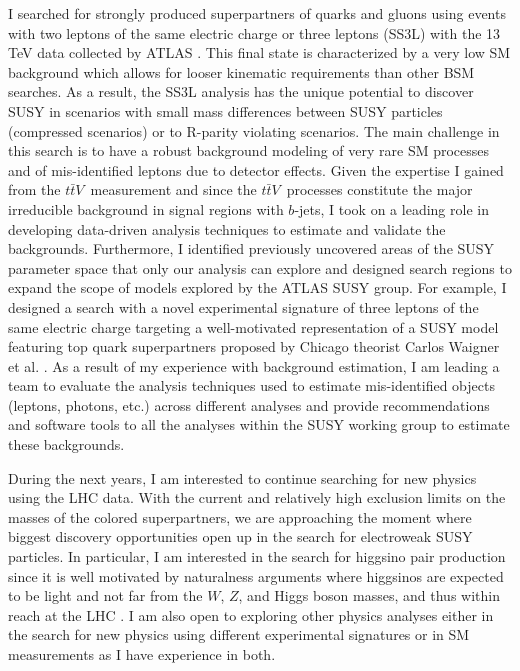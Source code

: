 \documentclass[a4paper]{article}
\newcommand{\ttbarV}{\ensuremath{t\bar{t}V}}
\begin{document}
I searched for strongly
produced superpartners of quarks and gluons using events with two leptons of the same electric
charge or three leptons (SS3L) with the 13 TeV data collected by ATLAS
\cite{conf-2015-SS3L,paper-2015-SS3L,conf-2016-SS3L}.
This final state is characterized by a very low SM background
which allows for looser kinematic requirements than other BSM searches. As a result, the SS3L analysis has the unique potential to discover SUSY
in scenarios with small mass differences between SUSY particles (compressed scenarios) or to R-parity violating scenarios.
The main challenge in this search is to have a robust background modeling of very rare SM processes and
of mis-identified leptons due to detector effects. Given the expertise I gained from the \ttbarV~measurement and since the \ttbarV~processes constitute
the major irreducible background in signal regions with $b$-jets, I took on a leading role in developing data-driven analysis techniques
to estimate and validate the backgrounds. Furthermore, I identified previously uncovered areas of the SUSY parameter space that only our analysis
can explore and designed search regions to expand the scope of models explored by the ATLAS SUSY group.
For example, I designed a search with a novel experimental signature of three leptons of the same electric
charge targeting a well-motivated representation of a SUSY model featuring top quark superpartners proposed by Chicago theorist
Carlos Waigner et al. \cite{stop_3lss}.
As a result of my experience with background estimation, I am leading a team to evaluate the analysis techniques used to estimate
mis-identified objects (leptons, photons, etc.) across different analyses and provide recommendations and software tools to all
the analyses within the SUSY working group to estimate these backgrounds.

During the next years, I am interested to continue searching for new physics using the LHC data.
 With the current and relatively high exclusion limits on the masses of the colored superpartners,
we are approaching the moment where biggest discovery opportunities open up in the search for electroweak SUSY particles.
In particular, I am interested in the search for higgsino pair production since it is well motivated by naturalness arguments where
higgsinos are expected to be light and not far from the $W$, $Z$, and Higgs boson masses, and thus within reach at the LHC \cite{natural}.
I am also open to exploring other physics analyses either in the search for new physics using different experimental signatures or in SM measurements
as I have experience in both.
\end{document}
